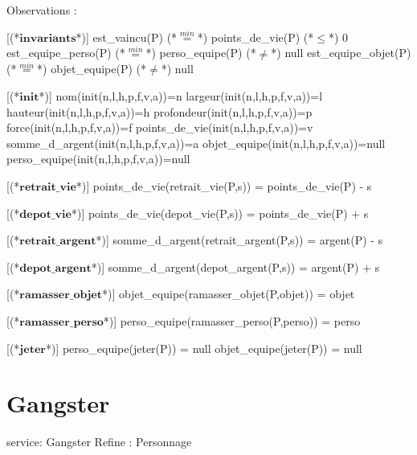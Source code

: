 \documentclass[a4paper, 11pt]{report}
\newcommand{\specB}[1]{\textbf{#1}}
\begin{document}
\begin{Spe}
Observations : 

	[(*$\specB{invariants}$*)]
		est_vaincu(P) (*$\stackrel{min}{=}$*) points_de_vie(P) (*$\le$*) 0
		est_equipe_perso(P) (*$\stackrel{min}{=}$*) perso_equipe(P) (*$\ne$*) null
		est_equipe_objet(P) (*$\stackrel{min}{=}$*) objet_equipe(P) (*$\ne$*) null
		
	[(*$\specB{init}$*)]
		nom(init(n,l,h,p,f,v,a))=n
		largeur(init(n,l,h,p,f,v,a))=l
		hauteur(init(n,l,h,p,f,v,a))=h
		profondeur(init(n,l,h,p,f,v,a))=p
		force(init(n,l,h,p,f,v,a))=f
		points_de_vie(init(n,l,h,p,f,v,a))=v
		somme_d_argent(init(n,l,h,p,f,v,a))=a
		objet_equipe(init(n,l,h,p,f,v,a))=null
		perso_equipe(init(n,l,h,p,f,v,a))=null
                
	[(*$\specB{retrait\_vie}$*)]
		points_de_vie(retrait_vie(P,s)) = points_de_vie(P) - s
		
	[(*$\specB{depot\_vie}$*)]
		points_de_vie(depot_vie(P,s)) = points_de_vie(P) + s 
		
	[(*$\specB{retrait\_argent}$*)]
		somme_d_argent(retrait_argent(P,s)) = argent(P) - s 
		
	[(*$\specB{depot\_argent}$*)]
		somme_d_argent(depot_argent(P,s)) = argent(P) + s 
		
	[(*$\specB{ramasser\_objet}$*)]
		objet_equipe(ramasser_objet(P,objet)) = objet 
		
	[(*$\specB{ramasser\_perso}$*)]
		perso_equipe(ramasser_perso(P,perso)) = perso 
		
	[(*$\specB{jeter}$*)]
		perso_equipe(jeter(P)) = null
		objet_equipe(jeter(P)) = null
\end{Spe}
\section{Gangster}
\begin{Spe}
service: Gangster
Refine : Personnage

 
\end{Spe}
\end{document}
